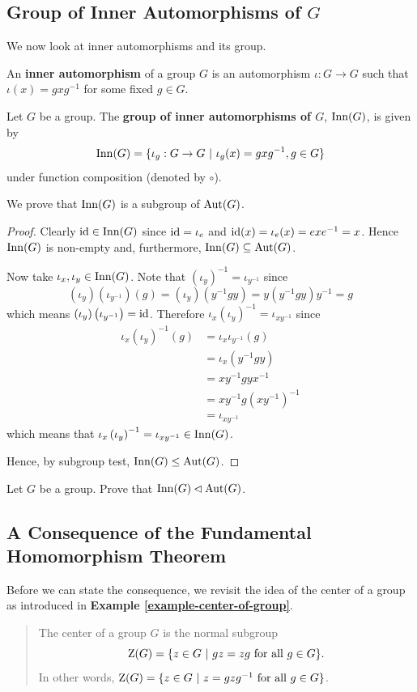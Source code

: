 \subsection{Group of Inner Automorphisms of $G$}
We now look at inner automorphisms and its group.
\begin{definition}
    An \textbf{inner automorphism} of a group $G$ is an automorphism $\iota: G \to G$ such that $\iota(x) = gxg^{-1}$ for some fixed $g \in G$.
\end{definition}
\begin{definition}
    Let $G$ be a group. The \textbf{group of inner automorphisms of $G$}, $\mathrm{Inn}(G)$, is given by
    \[
        \mathrm{Inn}(G) = \{\iota_g: G \to G \ | \ \iota_g(x) = gxg^{-1}, g \in G\}
    \]
    under function composition (denoted by $\circ$).
\end{definition}
We prove that $\mathrm{Inn}(G)$ is a subgroup of $\mathrm{Aut}(G)$.
\begin{proof}
    Clearly $\mathrm{id} \in \mathrm{Inn}(G)$ since $\mathrm{id} = \iota_e$ and $\mathrm{id}(x) = \iota_e(x) = exe^{-1} = x$. Hence $\mathrm{Inn}(G)$ is non-empty and, furthermore, $\mathrm{Inn}(G) \subseteq \mathrm{Aut}(G)$.

    Now take $\iota_x, \iota_y \in \mathrm{Inn}(G)$. Note that $\left(\iota_y\right)^{-1} = \iota_{y^{-1}}$ since
    \[
        \left(\iota_y\right)\left(\iota_{y^{-1}}\right)(g) = \left(\iota_y\right)\left(y^{-1}gy\right) = y\left(y^{-1}gy\right)y^{-1} = g
    \]
    which means $\left(\iota_y\right)\left(\iota_{y^{-1}}\right) = \mathrm{id}$. Therefore $\iota_x\left(\iota_y\right)^{-1} = \iota_{xy^{-1}}$ since
    \begin{align*}
        \iota_x\left(\iota_y\right)^{-1}(g) &= \iota_x\iota_{y^{-1}}(g)\\
        &= \iota_x\left(y^{-1}gy\right)\\
        &= xy^{-1}gyx^{-1}\\
        &= xy^{-1}g(xy^{-1})^{-1}\\
        &= \iota_{xy^{-1}}
    \end{align*}
    which means that $\iota_x\left(\iota_y\right)^{-1} = \iota_{xy^{-1}} \in \mathrm{Inn}(G)$.

    Hence, by subgroup test, $\mathrm{Inn}(G) \leq \mathrm{Aut}(G)$.
\end{proof}

\begin{exercise}
    Let $G$ be a group. Prove that $\mathrm{Inn}(G) \lhd \mathrm{Aut}(G)$.
\end{exercise}

\subsection{A Consequence of the Fundamental Homomorphism Theorem}
Before we can state the consequence, we revisit the idea of the center of a group as introduced in \textbf{Example \ref{example-center-of-group}}.
\begin{quote}
    The center of a group $G$ is the normal subgroup
    \[
        \Z{G} = \{z \in G \ | \ gz = zg \text{ for all } g \in G\}.
    \]
    In other words, $\mathrm{Z}(G) = \{z \in G \ | \ z = gzg^{-1} \text{ for all } g \in G\}$.
\end{quote}

